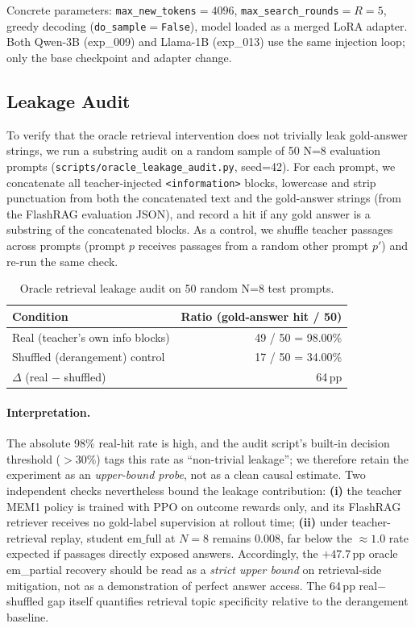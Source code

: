 Concrete parameters: \texttt{max\_new\_tokens}${}=4096$, \texttt{max\_search\_rounds}${}=R=5$, greedy decoding (\texttt{do\_sample}${}=$\texttt{False}), model loaded as a merged LoRA adapter. Both Qwen-3B (exp\_009) and Llama-1B (exp\_013) use the same injection loop; only the base checkpoint and adapter change.

\subsection*{Leakage Audit}
\label{app:leakage_audit}

To verify that the oracle retrieval intervention does not trivially leak gold-answer strings, we run a substring audit on a random sample of 50 N=8 evaluation prompts (\texttt{scripts/oracle\_leakage\_audit.py}, seed=42). For each prompt, we concatenate all teacher-injected \texttt{<information>} blocks, lowercase and strip punctuation from both the concatenated text and the gold-answer strings (from the FlashRAG evaluation JSON), and record a hit if any gold answer is a substring of the concatenated blocks. As a control, we shuffle teacher passages across prompts (prompt $p$ receives passages from a random other prompt $p'$) and re-run the same check.

\begin{table}[h]
\small
\centering
\begin{tabular}{lr}
\toprule
Condition & Ratio (gold-answer hit / 50) \\
\midrule
Real (teacher's own info blocks) & 49 / 50 = 98.00\% \\
Shuffled (derangement) control & 17 / 50 = 34.00\% \\
$\Delta$ (real $-$ shuffled) & 64\,pp \\
\bottomrule
\end{tabular}
\caption{Oracle retrieval leakage audit on 50 random N=8 test prompts.}
\label{tab:leakage_audit}
\end{table}

\paragraph{Interpretation.} The absolute 98\% real-hit rate is high, and the audit script's built-in decision threshold (${>}30\%$) tags this rate as ``non-trivial leakage''; we therefore retain the experiment as an \emph{upper-bound probe}, not as a clean causal estimate. Two independent checks nevertheless bound the leakage contribution: \textbf{(i)} the teacher MEM1 policy is trained with PPO on outcome rewards only, and its FlashRAG retriever receives no gold-label supervision at rollout time; \textbf{(ii)} under teacher-retrieval replay, student $\mathrm{em\_full}$ at $N=8$ remains $0.008$, far below the $\approx 1.0$ rate expected if passages directly exposed answers. Accordingly, the $+47.7$\,pp oracle em\_partial recovery should be read as a \emph{strict upper bound} on retrieval-side mitigation, not as a demonstration of perfect answer access. The 64\,pp real$-$shuffled gap itself quantifies retrieval topic specificity relative to the derangement baseline.

